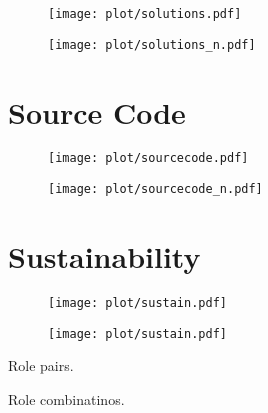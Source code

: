 \documentclass[headsepline,titlepage,twoside,12pt,toc=flat,headings=normal]{scrreprt}
\begin{document}
\begin{figure}[h!]
\texttt{[image: plot/solutions.pdf]}
\caption{}
\label{fig:solutions}
\end{figure}

\begin{figure}[h!]
\texttt{[image: plot/solutions\_n.pdf]}
\caption{}
\label{fig:solutions_n}
\end{figure}

\section{Source Code}

\begin{figure}[h!]
\texttt{[image: plot/sourcecode.pdf]}
\caption{}
\label{fig:sourcecode}
\end{figure}

\begin{figure}[h!]
\texttt{[image: plot/sourcecode\_n.pdf]}
\caption{}
\label{fig:sourcecode_n}
\end{figure}

\section{Sustainability}

\begin{figure}[h!]
\texttt{[image: plot/sustain.pdf]}
\caption{}
\label{fig:sustain}
\end{figure}

\begin{figure}[h!]
\texttt{[image: plot/sustain.pdf]}
\caption{}
\label{fig:sustain_n}
\end{figure}

\begin{table}
\caption{Role pairs.}
\label{tab:role_pairs}

\end{table}

%

\begin{table}
\caption{Role combinatinos.}
\label{tab:role_combinations}

\end{table}
\end{document}
